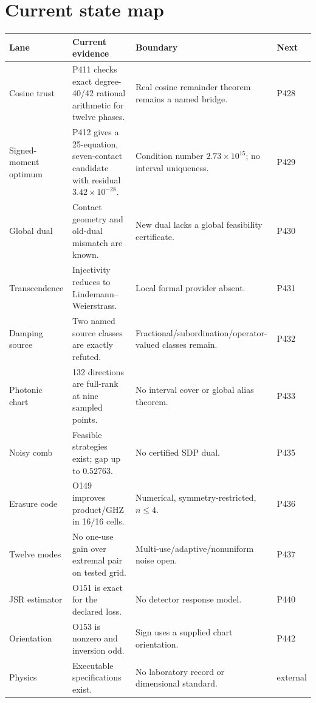 \documentclass[11pt,a4paper]{article}
\begin{document}
\section{Current state map}
\small
\begin{longtable}{p{}p{}p{}p{}}
\toprule
Lane & Current evidence & Boundary & Next\\\midrule
Cosine trust & P411 checks exact degree-40/42 rational arithmetic for twelve phases. & Real cosine remainder theorem remains a named bridge. & P428\\
Signed-moment optimum & P412 gives a 25-equation, seven-contact candidate with residual $3.42\times10^{-28}$. & Condition number $2.73\times10^{15}$; no interval uniqueness. & P429\\
Global dual & Contact geometry and old-dual mismatch are known. & New dual lacks a global feasibility certificate. & P430\\
Transcendence & Injectivity reduces to Lindemann--Weierstrass. & Local formal provider absent. & P431\\
Damping source & Two named source classes are exactly refuted. & Fractional/subordination/operator-valued classes remain. & P432\\
Photonic chart & 132 directions are full-rank at nine sampled points. & No interval cover or global alias theorem. & P433\\
Noisy comb & Feasible strategies exist; gap up to $0.52763$. & No certified SDP dual. & P435\\
Erasure code & O149 improves product/GHZ in 16/16 cells. & Numerical, symmetry-restricted, $n\le4$. & P436\\
Twelve modes & No one-use gain over extremal pair on tested grid. & Multi-use/adaptive/nonuniform noise open. & P437\\
JSR estimator & O151 is exact for the declared loss. & No detector response model. & P440\\
Orientation & O153 is nonzero and inversion odd. & Sign uses a supplied chart orientation. & P442\\
Physics & Executable specifications exist. & No laboratory record or dimensional standard. & external\\
\bottomrule
\end{longtable}
\normalsize
\end{document}
